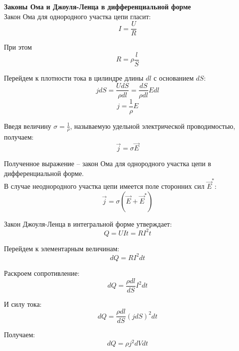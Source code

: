\documentclass{article}
\begin{document}
	
	\textbf{Законы Ома и Джоуля-Ленца в дифференциальной форме}\\

	Закон Ома для однородного участка цепи гласит:
	\begin{equation}
		I = \frac{U}{R}
	\end{equation}

	При этом
	\begin{equation}
		R = \rho\frac{l}{S}
	\end{equation}

	Перейдем к плотности тока в цилиндре длины $dl$ с основанием $dS$:
	\begin{equation}
		jdS = \frac{UdS}{\rho dl} = \frac{dS}{\rho dl}Edl
	\end{equation}
	\begin{equation}
		j = \frac{1}{\rho} E
	\end{equation}

	Введя величину $\sigma = \frac{1}{\rho}$, называемую удельной электрической проводимостью, получаем:
	\begin{equation}
		\vec j = \sigma\vec E
	\end{equation}

	Полученное выражение -- закон Ома для однородного участка цепи в дифференциальной форме.\\

	В случае неоднородного участка цепи имеется поле сторонних сил $\vec E^*$:
	\begin{equation}
		\vec j = \sigma(\vec E + \vec E^*)
	\end{equation}

	Закон Джоуля-Ленца в интегральной форме утверждает:
	\begin{equation}
		Q = UIt = RI^2 t
	\end{equation}

	Перейдем к элементарным величинам:
	\begin{equation}
		dQ = RI^2 dt
	\end{equation}

	Раскроем сопротивление:
	\begin{equation}
		dQ = \frac{\rho dl}{dS}I^2 dt
	\end{equation}

	И силу тока:
	\begin{equation}
		dQ = \frac{\rho dl}{dS}(j dS)^2 dt
	\end{equation}

	Получаем:
	\begin{equation}
		dQ = \rho j^2 dV dt
	\end{equation}
\end{document}
